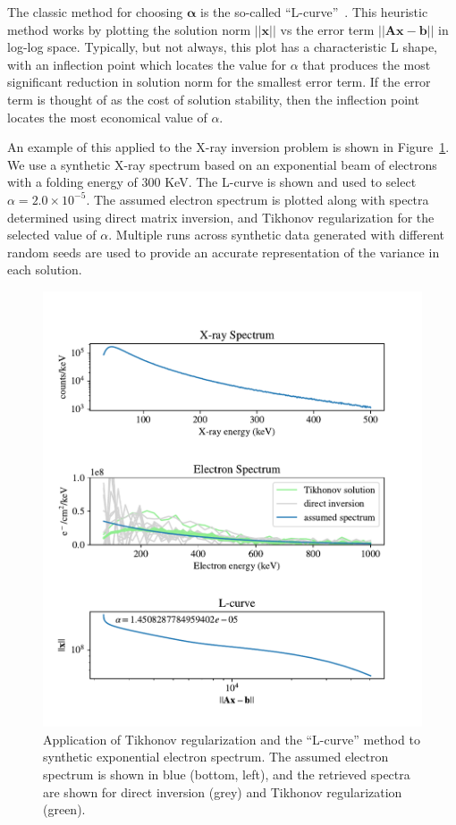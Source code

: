 The classic method for choosing $\mathbf{\alpha}$ is the so-called ``L-curve''~\citep{Hanke1996,Hansen1992,Hansen1993}. This heuristic method works by plotting the solution norm $\vert\vert \mathbf{x} \vert\vert$ vs the error term $\vert \vert \mathbf{A}\mathbf{x} - \mathbf{b} \vert \vert$ in log-log space. Typically, but not always, this plot has a characteristic L shape, with an inflection point which locates the value for $\alpha$ that produces the most significant reduction in solution norm for the smallest error term. If the error term is thought of as the cost of solution stability, then the inflection point locates the most economical value of $\alpha$. 

An example of this applied to the X-ray inversion problem is shown in Figure~\ref{l-curve-example}. We use a synthetic X-ray spectrum based on an exponential beam of electrons with a folding energy of 300 KeV. The L-curve is shown and used to select $\alpha = 2.0\times10^{-5}$. The assumed electron spectrum is plotted along with spectra determined using direct matrix inversion, and Tikhonov regularization for the selected value of $\alpha$. Multiple runs across synthetic data generated with different random seeds are used to provide an accurate representation of the variance in each solution. 

\begin{figure}[p]
    \centering
    \includegraphics[width=\textwidth]{figures/chapter_4/l-curve-example/L_curve_example_5.pdf}
    \caption{Application of Tikhonov regularization and the ``L-curve'' method to synthetic exponential electron spectrum. The assumed electron spectrum is shown in blue (bottom, left), and the retrieved spectra are shown for direct inversion (grey) and Tikhonov regularization (green).  }
    \label{l-curve-example}
\end{figure}

